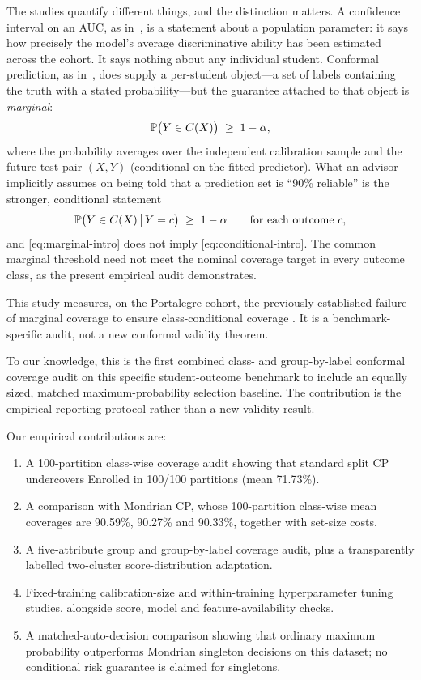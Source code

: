 The studies quantify different things, and the distinction matters. A
confidence interval on an AUC, as in~\cite{gu2026}, is a statement about a
population parameter: it says how precisely the model's average discriminative
ability has been estimated across the cohort. It says nothing about any
individual student. Conformal prediction, as in~\cite{elmasry2026}, does supply
a per-student object---a set of labels containing the truth with a stated
probability---but the guarantee attached to that object is \emph{marginal}:
\begin{equation}
\mathbb{P}\big(Y \in C(X)\big) \;\ge\; 1-\alpha ,
\label{eq:marginal-intro}
\end{equation}
where the probability averages over the independent calibration sample and the future test pair $(X,Y)$ (conditional on the fitted predictor). What an advisor
implicitly assumes on being told that a prediction set is ``90\% reliable'' is
the stronger, conditional statement
\begin{equation}
\mathbb{P}\big(Y \in C(X) \,\big|\, Y = c\big) \;\ge\; 1-\alpha
\qquad \text{for each outcome } c ,
\label{eq:conditional-intro}
\end{equation}
and \eqref{eq:marginal-intro} does not imply \eqref{eq:conditional-intro}. The
common marginal threshold need not meet the nominal coverage target in every
outcome class, as the present empirical audit demonstrates.

This study measures, on the Portalegre cohort, the previously established
failure of marginal coverage to ensure class-conditional coverage
\cite{ding2023,lofstrom2015}. It is a benchmark-specific audit, not a new
conformal validity theorem.

To our knowledge, this is the first combined class- and group-by-label
conformal coverage audit on this specific student-outcome benchmark to
include an equally sized, matched maximum-probability selection baseline.
The contribution is the empirical reporting protocol rather than a new
validity result.

Our empirical contributions are:
\begin{enumerate}
\item A 100-partition class-wise coverage audit showing that standard split CP
      undercovers \textsf{Enrolled} in 100/100 partitions (mean 71.73\%).
\item A comparison with Mondrian CP, whose 100-partition class-wise mean
      coverages are 90.59\%, 90.27\% and 90.33\%, together with set-size costs.
\item A five-attribute group and group-by-label coverage audit, plus a
      transparently labelled two-cluster score-distribution adaptation.
\item Fixed-training calibration-size and within-training hyperparameter
      tuning studies, alongside score, model and feature-availability checks.
\item A matched-auto-decision comparison showing that ordinary maximum
      probability outperforms Mondrian singleton decisions on this dataset;
      no conditional risk guarantee is claimed for singletons.
\end{enumerate}



